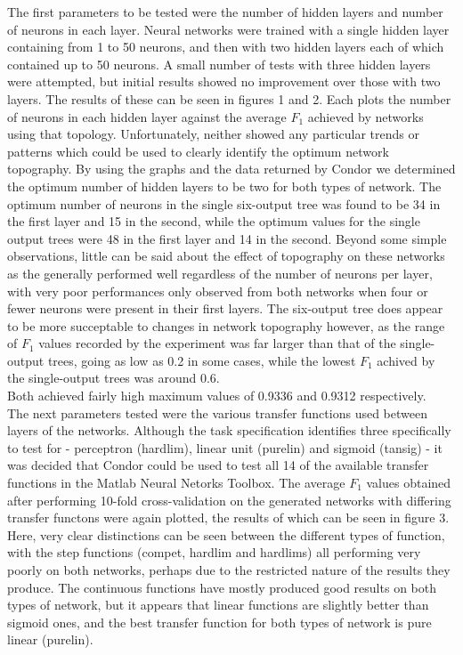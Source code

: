 \documentclass[a4paper]{article}
\begin{document}
The first parameters to be tested were the number of hidden layers and number of neurons in each layer. Neural networks were trained
with a single hidden layer containing from 1 to 50 neurons, and then with two hidden layers each of which contained up to 50 neurons.
A small number of tests with three hidden layers were attempted, but initial results showed no improvement over those with two layers. The
results of these can be seen in figures 1 and 2. Each plots the number of neurons in each hidden layer against the average $F_1$ achieved by
networks using that topology. Unfortunately, neither showed any particular trends or patterns which could be used to clearly identify the
optimum network topography. By using the graphs and the data returned by Condor we determined the optimum number of hidden layers to be
two for both types of network. The optimum number of neurons in the single six-output tree was found to be 34 in the first layer and 15 in the
second, while the optimum values for the single output trees were 48 in the first layer and 14 in the second. Beyond some simple observations,
little can be said about the effect of topography on these networks as the generally performed well regardless of the number of neurons per layer,
with very poor performances only observed from both networks when four or fewer neurons were present in their first layers. The six-output tree
does appear to be more succeptable to changes in network topography however, as the range of $F_1$ values recorded by the experiment was far larger
than that of the single-output trees, going as low as 0.2 in some cases, while the lowest $F_1$ achived by the single-output trees was around 0.6.\\
Both achieved fairly high maximum values of 0.9336 and 0.9312 respectively.\\

The next parameters tested were the various transfer functions used between layers of the networks. Although the task specification identifies
three specifically to test for - perceptron (hardlim), linear unit (purelin) and sigmoid (tansig) - it was decided that Condor could be used
to test all 14 of the available transfer functions in the Matlab Neural Netorks Toolbox. The average $F_1$ values obtained after performing
10-fold cross-validation on the generated networks with differing transfer functons were again plotted, the results of which can be seen in figure 3.
Here, very clear distinctions can be seen between the different types of function, with the step functions (compet, hardlim and hardlims) all
performing very poorly on both networks, perhaps due to the restricted nature of the results they produce. The continuous functions have mostly
produced good results on both types of network, but it appears that linear functions are slightly better than sigmoid ones, and the best transfer
function for both types of network is pure linear (purelin).\\
\end{document}
